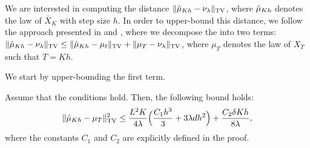 We are interested in computing the distance $\| \hat{\mu}_{Kh} - \nu_\lambda \|_{\textnormal{TV}}$, where $\hat{\mu}_{Kh}$ denotes the law of $\bar{X}_K$ with step size $h$. In order to upper-bound this distance, we follow the approach presented in \cite{dalalyan2017theoretical} and \cite{raginsky17a}, where we decompose the into two terms: $\| \hat{\mu}_{Kh} - \nu_\lambda \|_{\textnormal{TV}} \leq \| \hat{\mu}_{Kh} - \mu_t \|_{\textnormal{TV}} + \| \mu_{T} - \nu_\lambda \|_{\textnormal{TV}}$, where $\mu_T$ denotes the law of $X_T$ such that $T=Kh$. %

We start by upper-bounding the first term. 
%
\begin{lemma}
\label{lem:euler}
Assume that the conditions  hold. Then, the following bound holds:
\begin{align}
\| \hat{\mu}_{Kh} - \mu_{T} \|_{\textnormal{TV}}^2 \leq \frac{L^2 K}{4\lambda} \Bigl( \frac{C_1 h^3}{3} + 3 \lambda d h^2 \Bigr) + \frac{C_2 \delta K h}{8\lambda},
\end{align}
where the constants $C_1$ and $C_2$ are explicitly defined in the proof. 
\end{lemma}
%
%
